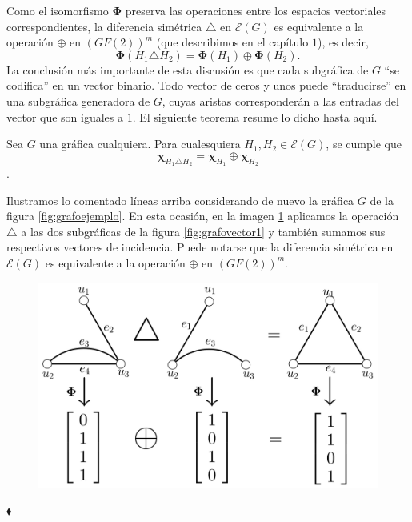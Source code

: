 Como el isomorfismo $\boldsymbol{\Phi}$ preserva las operaciones entre los espacios vectoriales correspondientes, la diferencia simétrica $\triangle$ en $\mathcal{E}(G)$ es equivalente a la operación $\oplus$ en $(GF(2))^{m}$ (que describimos en el capítulo $1$), es decir, $$\boldsymbol{\Phi}(H_{1} \triangle H_{2}) = \boldsymbol{\Phi}(H_{1}) \oplus \boldsymbol{\Phi}(H_{2}).$$ La conclusión más importante de esta discusión es que cada subgráfica de $G$ ``se codifica'' en un vector binario. Todo vector de ceros y unos puede ``traducirse'' en una subgráfica generadora de $G$, cuyas aristas corresponderán a las entradas del vector que son iguales a $1$. El siguiente teorema resume lo dicho hasta aquí.


\begin{teo} \label{teo:xor}
Sea $G$ una gráfica cualquiera. Para cualesquiera $H_{1}, H_{2} \in \mathcal{E}(G)$, se cumple que $$\boldsymbol{\chi}_{H_{1} \triangle H_{2}} = \boldsymbol{\chi}_{H_1} \oplus \boldsymbol{\chi}_{H_2}$$.
\end{teo}

\begin{ejem}
Ilustramos lo comentado líneas arriba considerando de nuevo la gráfica $G$ de la figura \ref{fig:grafoejemplo}. En esta ocasión, en la imagen \ref{fig:operacionesisomorfismo} aplicamos la operación $\triangle$ a las dos subgráficas de la figura \ref{fig:grafovector1} y también sumamos sus respectivos vectores de incidencia. Puede notarse que la diferencia simétrica en $\mathcal{E}(G)$ es equivalente a la operación $\oplus$ en $(GF(2))^{m}$. 

\begin{figure}[H]
    \centering
    \includegraphics[scale=0.2]{img/imgchapter3/operacionesisomorfismo.jpg}
    \caption{}
    \label{fig:operacionesisomorfismo}
\end{figure}

\hfill $\blacklozenge$
\end{ejem}

